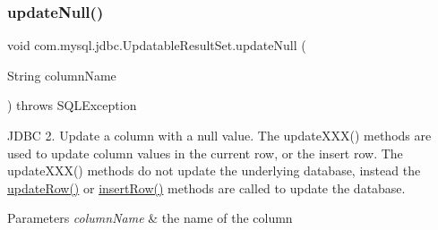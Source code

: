 \mbox{\label{classcom_1_1mysql_1_1jdbc_1_1_updatable_result_set_a6c296ecb4dc31d5ab887aa35b37c3996}} 
\subsubsection{\texorpdfstring{update\+Null()}{updateNull()}\hspace{0.1cm}{\footnotesize\ttfamily [2/2]}}
{\footnotesize\ttfamily void com.\+mysql.\+jdbc.\+Updatable\+Result\+Set.\+update\+Null (\begin{DoxyParamCaption}\item[{String}]{column\+Name }\end{DoxyParamCaption}) throws S\+Q\+L\+Exception}

J\+D\+BC 2. Update a column with a null value. The update\+X\+X\+X() methods are used to update column values in the current row, or the insert row. The update\+X\+X\+X() methods do not update the underlying database, instead the \mbox{\hyperlink{classcom_1_1mysql_1_1jdbc_1_1_updatable_result_set_a919969ba4b3c7cbc7b18605e9f31a746}{update\+Row()}} or \mbox{\hyperlink{classcom_1_1mysql_1_1jdbc_1_1_updatable_result_set_aef041f8d9d0778083716fc26652648fa}{insert\+Row()}} methods are called to update the database.


\begin{DoxyParams}{Parameters}
{\em column\+Name} & the name of the column\\
\hline
\end{DoxyParams}

